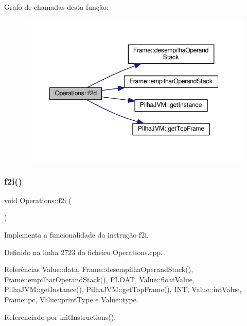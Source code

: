 Grafo de chamadas desta função\+:
\nopagebreak
\begin{figure}[H]
\begin{center}
\leavevmode
\includegraphics[width=348pt]{classOperations_afb29ca09bc75d3342920b1509aba3635_cgraph}
\end{center}
\end{figure}
\mbox{\label{classOperations_adea8a32fb2ba183d0200ac22e1126fde}} 
\subsubsection{\texorpdfstring{f2i()}{f2i()}}
{\footnotesize\ttfamily void Operations\+::f2i (\begin{DoxyParamCaption}{ }\end{DoxyParamCaption})\hspace{0.3cm}{\ttfamily [private]}}



Implementa a funcionalidade da instrução f2i. 



Definido na linha 2723 do ficheiro Operations.\+cpp.



Referências Value\+::data, Frame\+::desempilha\+Operand\+Stack(), Frame\+::empilhar\+Operand\+Stack(), F\+L\+O\+AT, Value\+::float\+Value, Pilha\+J\+V\+M\+::get\+Instance(), Pilha\+J\+V\+M\+::get\+Top\+Frame(), I\+NT, Value\+::int\+Value, Frame\+::pc, Value\+::print\+Type e Value\+::type.



Referenciado por init\+Instructions().

